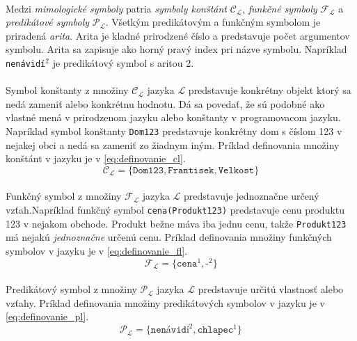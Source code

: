\paragraph{}
Medzi \emph{mimologické symboly} patria \emph{symboly konštánt} $\mathcal{C}_\mathcal{L}$, \emph{funkčné symboly} $\mathcal{F}_\mathcal{L}$ a \emph{predikátové symboly} $\mathcal{P}_\mathcal{L}$. Všetkým predikátovým a funkčným symbolom je priradená \emph{arita}. Arita je kladné prirodzené číslo a predstavuje počet argumentov symbolu. Arita sa zapisuje ako horný pravý index pri názve symbolu. Napríklad \texttt{nenávidí}$^2$ je predikátový symbol s aritou 2.

\paragraph{}
Symbol konštanty z množiny $\mathcal{C}_\mathcal{L}$ jazyka $\mathcal{L}$ predstavuje konkrétny objekt ktorý sa nedá zameniť alebo konkrétnu hodnotu. Dá sa povedať, že sú podobné ako vlastné mená v prirodzenom jazyku alebo konštanty v programovacom jazyku. Napríklad symbol konštanty \texttt{Dom123} predstavuje konkrétny dom s číslom 123 v nejakej obci a nedá sa zameniť zo žiadnym iným. Príklad definovania množiny konštánt v jazyku je v \ref{eq:definovanie_cl}.
\begin{equation} \label{eq:definovanie_cl}
\mathcal{C}_\mathcal{L} = \{\texttt{Dom123}, \texttt{Frantisek}, \texttt{Velkost}\}
\end{equation}

\paragraph{}
Funkčný symbol z množiny $\mathcal{F}_\mathcal{L}$ jazyka $\mathcal{L}$ predstavuje jednoznačne určený vzťah.Napríklad funkčný symbol \texttt{cena(Produkt123)} predstavuje cenu produktu 123 v nejakom obchode. Produkt bežne máva iba jednu cenu, takže \texttt{Produkt123} má nejakú \emph{jednoznačne} určenú cenu. Príklad definovania množiny funkčných symbolov v jazyku je v \ref{eq:definovanie_fl}.
\begin{equation} \label{eq:definovanie_fl}
\mathcal{F}_\mathcal{L} = \{\texttt{cena}^1, \texttt{-}^2\}
\end{equation}

\paragraph{}
Predikátový symbol z množiny $\mathcal{P}_\mathcal{L}$ jazyka $\mathcal{L}$ predstavuje určitú vlastnosť alebo vzťahy. Príklad definovania množiny predikátových symbolov v jazyku je v \ref{eq:definovanie_pl}.
\begin{equation} \label{eq:definovanie_pl}
\mathcal{P}_\mathcal{L} = \{\texttt{nenávidí}^2, \texttt{chlapec}^1\}
\end{equation}

